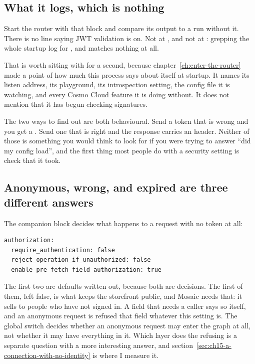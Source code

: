 \subsection*{What it logs, which is nothing}

%
Start the router with that block and compare its output to a run without it.
There is no line saying JWT validation is on. Not at , and not at
: grepping the whole startup log for ,  and
 matches nothing at all.

That is worth sitting with for a second, because chapter~\ref{ch:enter-the-router}
made a point of how much this process says about itself at startup. It names its
listen address, its playground, its introspection setting, the config file it is
watching, and every Cosmo Cloud feature it is doing without. It does not mention
that it has begun checking signatures.

The two ways to find out are both behavioural. Send a token that is wrong and
you get a . Send one that is right and the response carries an
 header. Neither of those is something you would
think to look for if you were trying to answer \enquote{did my config load}, and
the first thing most people do with a security setting is check that it took.

\subsection*{Anonymous, wrong, and expired are three different answers}

%
The companion block decides what happens to a request with no token at all:

\begin{verbatim}
authorization:
  require_authentication: false
  reject_operation_if_unauthorized: false
  enable_pre_fetch_field_authorization: true
\end{verbatim}

The first two are defaults written out, because both are decisions. The first of
them, left false, is what keeps the storefront public, and Mosaic needs that: it
sells to people who have not signed in. A field that needs a caller says so
itself, and an anonymous request is refused that field whatever this setting is.
The global switch decides whether an anonymous request may enter the graph at
all, not whether it may have everything in it. Which layer does the refusing is
a separate question with a more interesting answer, and
section~\ref{sec:ch15-a-connection-with-no-identity} is where I measure it.

